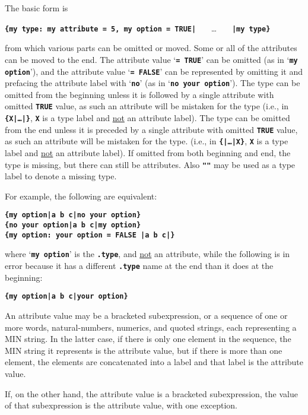 \documentclass[12pt]{article}
\newcommand{\TT}[1]{{\tt \bfseries #1}}
\begin{document}
The basic form is
\begin{center}
\TT{\{my type: my attribute = 5, my option = TRUE|} ~~~\ldots~~~
    \TT{|my type\}} \\
\end{center}
from which various parts can be omitted or moved.  Some or all of the
attributes can be moved to the end.
The attribute value `\TT{= TRUE}' can be omitted (as in
`\TT{my option}'), and the attribute value `\TT{= FALSE}' can be represented
by omitting it and prefacing the attribute label with `\TT{no}'
(as in `\TT{no your option}').
The type can be omitted from the beginning unless it is followed by
a single attribute with omitted \TT{TRUE} value, as such an attribute
will be mistaken for the type (i.e., in \TT{\{X|\ldots|\}}, \TT{X} is
a type label and \underline{not} an attribute label).
The type can be omitted from the end unless it is preceded
by a single attribute with omitted \TT{TRUE} value, as such an attribute
will be mistaken for the type.
(i.e., in \TT{\{|\ldots|X\}}, \TT{X} is
a type label and \underline{not} an attribute label).
If omitted from both
beginning and end, the type is missing, but there can still be
attributes.  Also \TT{""} may be used as a type label to denote
a missing type.

For example, the following are equivalent:
\begin{center}
\TT{\{my option|a b c|no your option\}} \\
\TT{\{no your option|a b c|my option\}} \\
\TT{\{my option:~your option = FALSE |a b c|\}}
\end{center}

where `\TT{my option}' is the \TT{.type}, and \underline{not}
an attribute,
while the following is in error because it has a different \TT{.type} name
at the end than it does at the beginning:
\begin{center}
\TT{\{my option|a b c|your option\}} \\
\end{center}

An attribute value may be a bracketed subexpression, or a sequence
of one or more words, natural-numbers, numerics, and quoted strings, each
representing a MIN string.
In the latter case, if there is only
one element in the sequence, the MIN string it represents is the
attribute value, but if there is more than one element, the elements
are concatenated into a label and that label is the attribute value.

If, on the other hand, the attribute value is a bracketed subexpression,
the value of that subexpression is the attribute value, with one exception.
\end{document}
